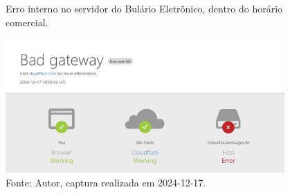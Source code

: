 \begin{frame}
	\begin{figure}
	    \centering
	    \caption*{Erro interno no servidor do Bulário Eletrônico, dentro do horário comercial.}
	    \includegraphics[keepaspectratio, width=0.95\textwidth, height=0.7\textheight]{../pictures/2024-12-17 13.55.09 consultas.anvisa.gov.br 097b2055395f.png}
	    \caption*{Fonte: Autor, captura realizada em 2024-12-17.}
	\end{figure}
\end{frame}


